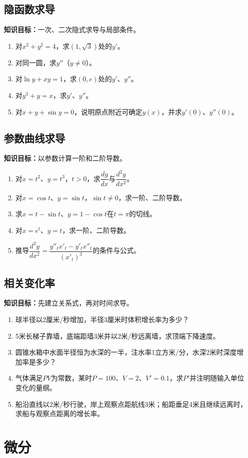 \documentclass[11pt,a4paper,fontset=fandol]{ctexrep}
\newcommand{\goal}[1]{\textbf{知识目标：}#1\par}
\begin{document}
\subsection{隐函数求导}
\goal{一次、二次隐式求导与局部条件。}
\begin{enumerate}
\item 对$x^2+y^2=4$，求$(1,\sqrt3)$处的$y'$。
\item 对同一圆，求$y''$（$y\ne0$）。
\item 对$\ln y+xy=1$，求$(0,e)$处的$y'$、$y''$。
\item 对$y^3+y=x$，求$y'$、$y''$。
\item 对$x+y+\sin y=0$，说明原点附近可确定$y(x)$，并求$y'(0)$、$y''(0)$。
\end{enumerate}
\subsection{参数曲线求导}
\goal{以参数计算一阶和二阶导数。}
\begin{enumerate}
\item 对$x=t^2$、$y=t^3$，$t>0$，求$\dfrac{dy}{dx}$与$\dfrac{d^2y}{dx^2}$。
\item 对$x=\cos t$、$y=\sin t$，$\sin t\ne0$，求一阶、二阶导数。
\item 求$x=t-\sin t$、$y=1-\cos t$在$t=\pi$的切线。
\item 对$x=e^t$、$y=t$，求一阶、二阶导数。
\item 推导$\dfrac{d^2y}{dx^2}=\dfrac{y''_t x'_t-y'_t x''_t}{(x'_t)^3}$的条件与公式。
\end{enumerate}
\subsection{相关变化率}
\goal{先建立关系式，再对时间求导。}
\begin{enumerate}
\item 球半径以2厘米/秒增加，半径3厘米时体积增长率为多少？
\item 5米长梯子靠墙，底端距墙3米并以2米/秒远离墙，求顶端下降速度。
\item 圆锥水箱中水面半径恒为水深的一半，注水率1立方米/分，水深2米时深度增加率是多少？
\item 气体满足$PV$为常数，某时$P=100$、$V=2$、$V'=0.1$，求$P'$并注明随输入单位变化的量纲。
\item 船沿直线以2米/秒行驶，岸上观察点距航线3米；船距垂足4米且继续远离时，求船与观察点距离的增长率。
\end{enumerate}
\section{微分}
\end{document}
